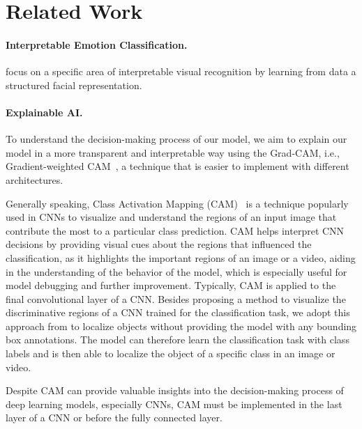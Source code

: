 \section{Related Work}
\label{sec:related}

\paragraph{Interpretable Emotion Classification.}

\citet{YinTLS019} focus on a specific area of interpretable visual recognition by learning from data a structured facial representation. 
\citet{Malik0R21} 

\paragraph{Explainable AI.}
To understand the decision-making process of our model, 
we aim to explain our model in a more transparent and interpretable way using the Grad-CAM, 
i.e., Gradient-weighted CAM~\cite{SelvarajuCDVPB17}, 
a technique that is easier to implement with different architectures. 

Generally speaking, 
Class Activation Mapping (CAM)~\cite{ZhouKLOT16} is a technique popularly used in CNNs to visualize and understand the regions of an input image that contribute the most to a particular class prediction. 
CAM helps interpret CNN decisions by providing visual cues about the regions that influenced the classification, 
as it highlights the important regions of an image or a video, 
aiding in the understanding of the behavior of the model, 
which is especially useful for model debugging and further improvement. 
Typically,
CAM is applied to the final convolutional layer of a CNN. 
Besides proposing a method to visualize the discriminative regions of a CNN trained for the classification task, 
we adopt this approach from \citet{ZhouKLOT16} to localize objects without providing the model with any bounding box annotations. 
The model can therefore learn the classification task with class labels and is then able to localize the object of a specific class in an image or video. 

Despite CAM can provide valuable insights into the decision-making process of deep learning models, 
especially CNNs, 
CAM must be implemented in the last layer of a CNN or before the fully connected layer.

